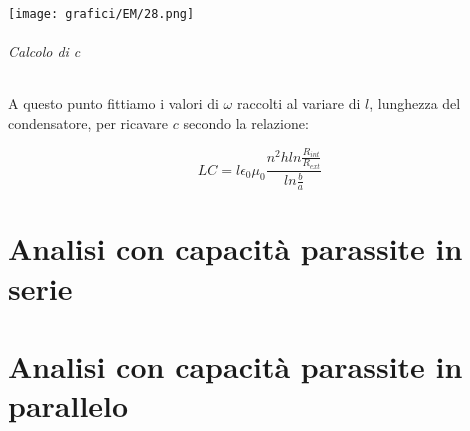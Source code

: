 \texttt{[image: grafici/EM/28.png]}
















\subparagraph*{Calcolo di c}

A questo punto fittiamo i valori di $\omega$ raccolti al variare di $l$, lunghezza del condensatore, per ricavare $c$ secondo la relazione:

\begin{equation}
 LC = l \epsilon_{0} \mu_{0} \frac{n^2 h ln\frac{R_{int}}{R_{ext}}}{ln \frac{b}{a}}
\end{equation}

\chapter{Analisi con capacità parassite in serie}
\chapter{Analisi con capacità parassite in parallelo}


